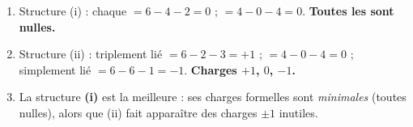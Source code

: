 \documentclass[11pt,a4paper]{article}
\begin{document}
\begin{corrige}
\begin{enumerate}[label=\alph*)]
  \item Structure (i)  : chaque  $= 6-4-2 = 0$ ;  $= 4-0-4 = 0$.
        \textbf{Toutes les \CF{} sont nulles.}
  \item Structure (ii)  :  triplement lié $= 6-2-3 = +1$ ;  $= 4-0-4 = 0$ ;
         simplement lié $= 6-6-1 = -1$. \textbf{Charges $+1$, $0$, $-1$.}
  \item La structure \textbf{(i)} est la meilleure : ses charges formelles sont \emph{minimales}
        (toutes nulles), alors que (ii) fait apparaître des charges $\pm 1$ inutiles.
\end{enumerate}
\end{corrige}
\end{document}
